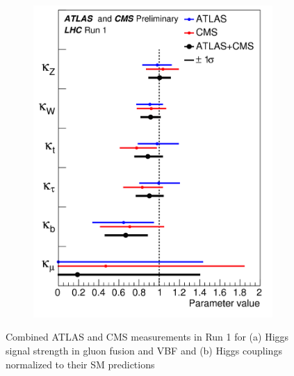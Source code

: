 \begin{figure}[h!]
\begin{subfigure}[t]{0.5\textwidth}
        \includegraphics[width=\textwidth]{figures/ATLAS_CMS_couplings}
        \caption{}
    \end{subfigure}

   \caption{Combined ATLAS and CMS measurements in Run 1 for (a) Higgs signal strength in gluon fusion and VBF and (b) Higgs couplings normalized to their SM predictions}
  \label{fig:ATLAS-CMS-comb}
\end{figure}

